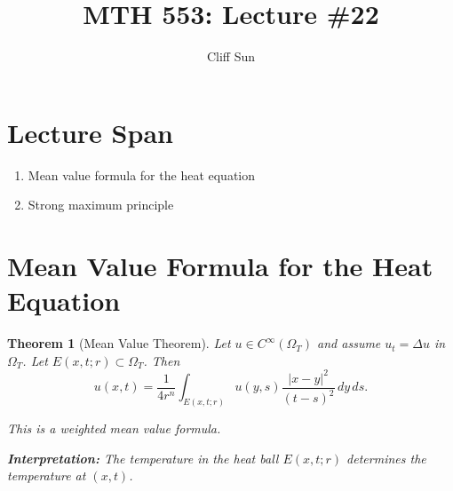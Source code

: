\documentclass{article}
\title{MTH 553: Lecture \#22}
\author{Cliff Sun}
\newtheorem{theorem}{Theorem}[section]
\begin{document}
\maketitle

\section*{Lecture Span}
\begin{enumerate}
    \item Mean value formula for the heat equation
    \item Strong maximum principle
\end{enumerate}

\section*{Mean Value Formula for the Heat Equation}

\begin{theorem}[Mean Value Theorem]
Let $u \in C^\infty(\Omega_T)$ and assume $u_t = \Delta u$ in $\Omega_T$.  
Let $E(x,t;r) \subset \Omega_T$. Then
\[
u(x,t) = \frac{1}{4r^n}
\int_{E(x,t;r)}
u(y,s)\frac{|x-y|^2}{(t-s)^2}\, dy\, ds .
\]

This is a weighted mean value formula.

\textbf{Interpretation:} The temperature in the heat ball $E(x,t;r)$ determines the temperature at $(x,t)$.
\end{theorem}
\end{document}

